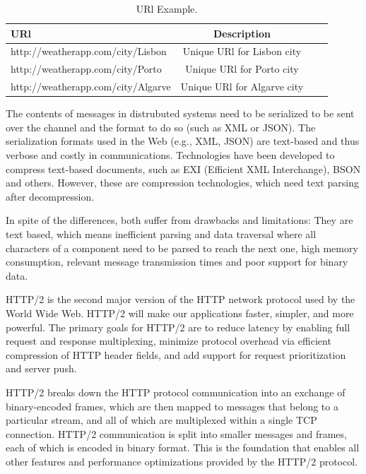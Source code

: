 \documentclass[runningheads,a4paper]{llncs}
\begin{document}
\begin{table}[!htb]
  \renewcommand{\arraystretch}{1.2} %
  \centering
  \begin{tabular}{lccc}
    \toprule
    URl & Description  \\
    \midrule
    http://weatherapp.com/city/Lisbon &  Unique URl for Lisbon city\\
    http://weatherapp.com/city/Porto & Unique URl for Porto city\\
    http://weatherapp.com/city/Algarve & Unique URl for Algarve city\\
    \bottomrule
  \end{tabular}
  \caption[URl Example.]{URl Example.}
  \label{tab:urlexample}
\end{table}

The contents of messages in distrubuted systems need to be serialized to be sent over the channel and the format to do so (such as XML or JSON). The serialization formats used in the Web (e.g., XML, JSON) are text-based and thus verbose and costly in communications. Technologies have been developed to compress text-based documents\cite{state5_3}, such as EXI (Efficient XML Interchange), BSON and others\cite{state5_4}. However, these are compression technologies, which need text parsing after decompression.

In spite of the differences, both suffer from drawbacks and limitations: They are text based, which means inefficient parsing and data traversal where all characters of a component need to be parsed to reach the next one, high memory consumption, relevant message transmission times and poor support for binary data.

HTTP/2 is the second major version of the HTTP network protocol used by the World Wide Web. HTTP/2 will make our applications faster, simpler, and more powerful. The primary goals for HTTP/2 are to reduce latency by enabling full request and response multiplexing, minimize protocol overhead via efficient compression of HTTP header fields, and add support for request prioritization and server push\cite{state10}.

HTTP/2 breaks down the HTTP protocol communication into an exchange of binary-encoded frames, which are then mapped to messages that belong to a particular stream, and all of which are multiplexed within a single TCP connection. HTTP/2 communication is split into smaller messages and frames, each of which is encoded in binary format. This is the foundation that enables all other features and performance optimizations provided by the HTTP/2 protocol.
\end{document}
